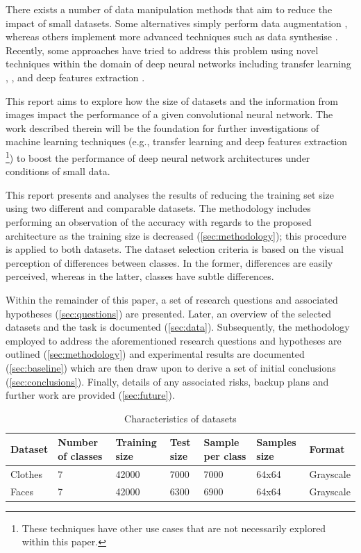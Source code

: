 \documentclass{article}
\begin{document}
There exists a number of data manipulation methods that aim to reduce the impact of small datasets. Some alternatives simply perform data augmentation \cite{krizhevsky2012imagenet}, whereas others implement more advanced techniques such as data synthesise \cite{hu2018frankenstein}. Recently, some approaches have tried to address this problem using novel techniques within the domain of deep neural networks including transfer learning \citep{ng2015deep}, \cite{oquab2014learning}, and deep features extraction \citep{chen2016deep}.

This report aims to explore how the size of datasets and the information from images impact the performance of a given convolutional neural network. The work described therein will be the foundation for further investigations of machine learning techniques (e.g., transfer learning and deep features extraction \footnote{These techniques have other use cases that are not necessarily explored within this paper.}) to boost the performance of deep neural network architectures under conditions of small data.

This report presents and analyses the results of reducing the training set size using two different and comparable datasets. The methodology includes performing an observation of the accuracy with regards to the proposed architecture as the training size is decreased (\ref{sec:methodology}); this procedure is applied to both datasets. The dataset selection criteria is based on the visual perception of differences between classes. In the former, differences are easily perceived, whereas in the latter, classes have subtle differences.

Within the remainder of this paper, a set of research questions and associated hypotheses (\ref{sec:questions}) are presented. Later, an overview of the selected datasets and the task is documented (\ref{sec:data}). Subsequently, the methodology employed to address the aforementioned research questions and hypotheses are outlined (\ref{sec:methodology}) and experimental results are documented (\ref{sec:baseline}) which are then draw upon to derive a set of initial conclusions (\ref{sec:conclusions}). Finally, details of any associated risks, backup plans and further work are provided (\ref{sec:future}).

 
\begin{table}[!htb]
  \centering
  \begin{tabular}{| l | l | l | l | l | l | l |}
    \hline
    \textbf{Dataset} & \textbf{Number of classes} & \textbf{Training size} & \textbf{Test size}  &  \textbf{Sample per class} & \textbf{Samples size} & \textbf{Format} \\ \hline
    Clothes & 7 & 42000 & 7000 & 7000 & 64x64 & Grayscale\\ \hline
    Faces & 7 & 42000 & 6300 & 6900 & 64x64 & Grayscale\\ \hline
  \end{tabular}
  \caption{Characteristics of datasets}
  \label{tab:1}
\end{table}
\end{document}
